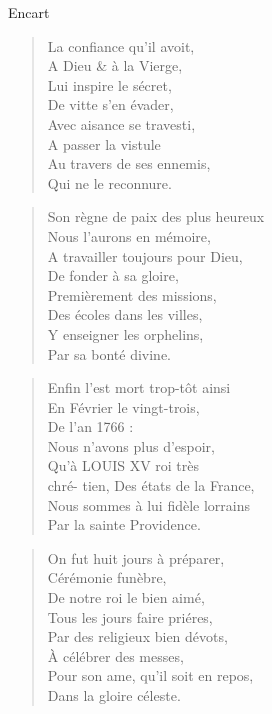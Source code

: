 \begin{diary}{Encart}{}
        \begin{verse}La confiance qu'il avoit,\\A Dieu \& à la Vierge,\\Lui inspire le sécret,\\De vitte s'en évader,\\Avec aisance se travesti,\\A passer la vistule\\Au travers de ses ennemis,\\Qui ne le reconnure.\\\end{verse}
        \bigskip

        \begin{verse}Son règne de paix des plus heureux\\Nous l'aurons en mémoire,\\A travailler toujours pour Dieu,\\De fonder à sa gloire,\\Premièrement des missions,\\Des écoles dans les villes,\\Y enseigner les orphelins,\\Par sa bonté divine.\\\end{verse}
        \bigskip

        \begin{verse}Enfin l’est mort trop-tôt ainsi\\En Février le vingt-trois,\\De l'an 1766 :\\Nous n'avons plus d'espoir,\\Qu’à LOUIS XV roi très \\chré-
                                    tien, Des états de
                                    la France,\\Nous sommes à lui fidèle lorrains\\Par la sainte Providence.\\\end{verse}
        \bigskip

        \begin{verse}On fut huit jours à préparer,\\Cérémonie funèbre,\\De notre roi le bien
                                 aimé,\\Tous les jours faire priéres,\\Par des religieux bien dévots,\\À célébrer des messes,\\Pour son ame, qu'il soit en repos,\\Dans la gloire céleste.\\\end{verse}
        \bigskip


\end{diary}
